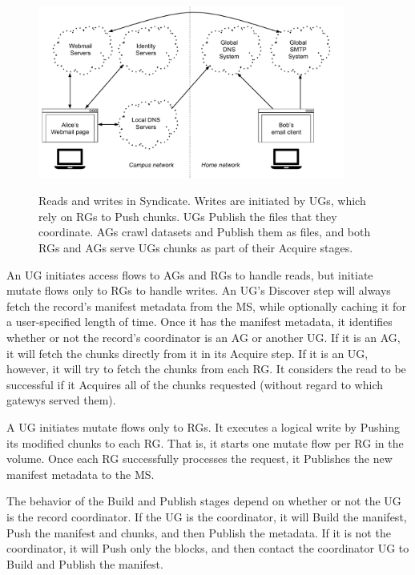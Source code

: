 \begin{figure}[h]
   \caption{Reads and writes in Syndicate.  Writes are initiated by UGs, which
   rely on RGs to Push chunks.  UGs Publish the files that they coordinate.  AGs
   crawl datasets and Publish them as files, and both RGs and AGs serve UGs
   chunks as part of their Acquire stages.}
   \centering
   \includegraphics[width=0.9\textwidth,page=21]{figures/dissertation-figures}
   \label{fig:chap3-syndicate-reads-writes}
\end{figure}

An UG initiates access flows to AGs and RGs to handle reads, but initiate mutate
flows only to RGs to handle writes.  An UG's Discover step will always fetch the
record's manifest metadata from the MS, while optionally caching it for a
user-specified length of time.  Once it has the manifest metadata, it identifies
whether or not the record's coordinator is an AG or another UG.   If it is an
AG, it will fetch the chunks directly from it in its Acquire step.  If it is an
UG, however, it will try to fetch the chunks from each RG.  It considers the
read to be successful if it Acquires all of the chunks requested (without regard
to which gatewys served them).

A UG initiates mutate flows only to RGs.  It executes a logical write by Pushing
its modified chunks to each RG.  That is, it starts one mutate flow per RG in
the volume.  Once each RG successfully processes the request, it Publishes the
new manifest metadata to the MS.

The behavior of the Build and Publish stages depend on whether or not the UG is
the record coordinator.  If the UG is the coordinator, it will Build the
manifest, Push the manifest and chunks, and then Publish the metadata.  If it is
not the coordinator, it will Push only the blocks, and then
contact the coordinator UG to Build and Publish the manifest.

